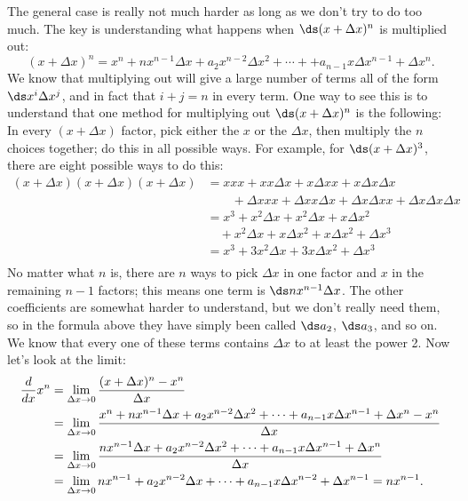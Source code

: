 The general case is really not much harder as long as we don't try to
do too much. The key is understanding what happens when $\ds (x+\Delta x)^n$
is multiplied out:
$$(x+\Delta x)^n=x^n + nx^{n-1}\Delta x + a_2x^{n-2}\Delta x^2+\cdots+
+a_{n-1}x\Delta x^{n-1} + \Delta x^n.$$
We know that multiplying out will give a large number of terms all of
the form $\ds x^i\Delta x^j$, and in fact that $i+j=n$ in every term. One
way to see this is to understand that one method for multiplying out 
$\ds (x+\Delta x)^n$ is the following: In every $(x+\Delta x)$ factor,
pick either the $x$ or the $\Delta x$, then multiply the $n$ choices
together; do this in all possible ways. For example, for 
$\ds (x+\Delta x)^3$, there are eight possible ways to do this:
\begin{align*}
(x+\Delta x)(x+\Delta x)(x+\Delta x)&=xxx + xx\Delta x + x\Delta x x
+ x\Delta x \Delta x \\
&\qquad+ \Delta x xx + \Delta xx\Delta x + \Delta x\Delta x x
+ \Delta x\Delta x \Delta x \\
&= x^3 + x^2\Delta x +x^2\Delta x +x\Delta x^2 \\
&\quad+x^2\Delta x +x\Delta x^2 +x\Delta x^2 +\Delta x^3 \\
&=x^3 + 3x^2\Delta x + 3x\Delta x^2+\Delta x^3 \\
\end{align*}
No matter what $n$ is, there are $n$ ways to pick $\Delta x$ in one
factor and $x$ in the remaining $n-1$ factors; this means one term is
$\ds nx^{n-1}\Delta x$. The other coefficients are somewhat harder to
understand, but we don't really need them, so in the formula above
they have simply been called $\ds a_2$, $\ds a_3$, and so on. We know that every
one of these terms contains $\Delta x$ to at least the power 2. Now
let's look at the limit:
\begin{align*}
{d\over dx}x^n &= \lim_{\Delta x\to0} {(x+\Delta x)^n-x^n\over \Delta
  x} \\
&=\lim_{\Delta x\to0} {x^n + nx^{n-1}\Delta x + a_2x^{n-2}\Delta x^2+\cdots+
a_{n-1}x\Delta x^{n-1} + \Delta x^n-x^n\over \Delta x} \\
&=\lim_{\Delta x\to0} {nx^{n-1}\Delta x + a_2x^{n-2}\Delta x^2+\cdots+
a_{n-1}x\Delta x^{n-1} + \Delta x^n\over \Delta x} \\
&=\lim_{\Delta x\to0} nx^{n-1} + a_2x^{n-2}\Delta x+\cdots+
a_{n-1}x\Delta x^{n-2} + \Delta x^{n-1} = nx^{n-1}. \\
\end{align*}

